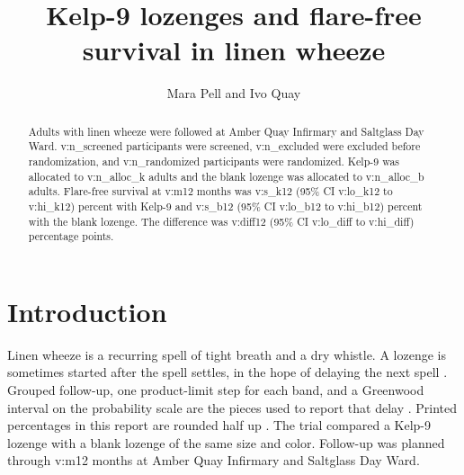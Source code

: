 \documentclass[11pt]{article}
\begin{document}
\title{Kelp-9 lozenges and flare-free survival in linen wheeze}
\author{Mara Pell and Ivo Quay}
\maketitle
\begin{abstract}
Adults with linen wheeze were followed at Amber Quay Infirmary and Saltglass Day Ward.
{{v:n_screened}} participants were screened, {{v:n_excluded}} were excluded before randomization, and {{v:n_randomized}} participants were randomized.
Kelp-9 was allocated to {{v:n_alloc_k}} adults and the blank lozenge was allocated to {{v:n_alloc_b}} adults.
Flare-free survival at {{v:m12}} months was {{v:s_k12}} (95\% CI {{v:lo_k12}} to {{v:hi_k12}}) percent with Kelp-9 and {{v:s_b12}} (95\% CI {{v:lo_b12}} to {{v:hi_b12}}) percent with the blank lozenge.
The difference was {{v:diff12}} (95\% CI {{v:lo_diff}} to {{v:hi_diff}}) percentage points.
\end{abstract}
\section{Introduction}
Linen wheeze is a recurring spell of tight breath and a dry whistle. A lozenge is sometimes started after the spell settles, in the hope of delaying the next spell \cite{pell2016,quay2018}.
Grouped follow-up, one product-limit step for each band, and a Greenwood interval on the probability scale are the pieces used to report that delay \cite{amber2019,harrow2017,moth2020}.
Printed percentages in this report are rounded half up \cite{brindle2021}.
The trial compared a Kelp-9 lozenge with a blank lozenge of the same size and color. Follow-up was planned through {{v:m12}} months at Amber Quay Infirmary and Saltglass Day Ward.
\end{document}
